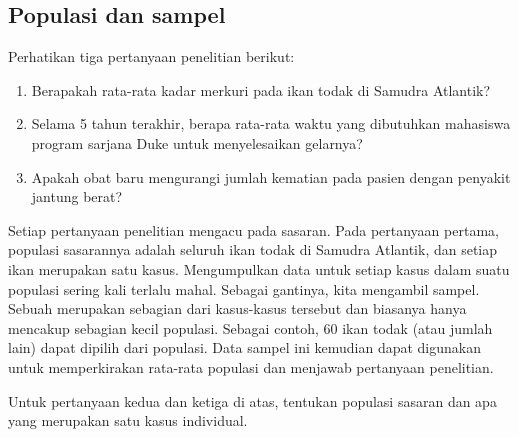 \subsection{Populasi dan sampel}
\label{populationsAndSamples}

\noindent%
Perhatikan tiga pertanyaan penelitian berikut:
\begin{enumerate}
\setlength{\itemsep}{0mm}
\item
    Berapakah rata-rata kadar merkuri pada ikan todak
    di Samudra Atlantik?
\item
    \label{timeToGraduationQuestionForUCLAStudents}%
    Selama 5 tahun terakhir, berapa rata-rata waktu yang dibutuhkan
    mahasiswa program sarjana Duke untuk menyelesaikan gelarnya?
\item
    \label{identifyPopulationOfStentStudy}%
    Apakah obat baru mengurangi jumlah kematian pada pasien
    dengan penyakit jantung berat?
\end{enumerate}
Setiap pertanyaan penelitian mengacu pada  sasaran. Pada
pertanyaan pertama, populasi sasarannya adalah seluruh ikan todak di Samudra
Atlantik, dan setiap ikan merupakan satu kasus. Mengumpulkan data untuk setiap
kasus dalam suatu populasi sering kali terlalu mahal. Sebagai gantinya, kita
mengambil sampel. Sebuah  merupakan sebagian dari kasus-kasus
tersebut dan biasanya hanya mencakup sebagian kecil populasi. Sebagai contoh,
60 ikan todak (atau jumlah lain) dapat dipilih dari populasi. Data sampel ini
kemudian dapat digunakan untuk memperkirakan rata-rata populasi dan menjawab
pertanyaan penelitian.

\begin{exercisewrap}
\begin{nexercise}\label{identifyingThePopulationForTwoQuestionsInPopAndSampSubsection}%
Untuk pertanyaan kedua dan ketiga di atas,
tentukan populasi sasaran dan apa yang
merupakan satu kasus individual.\footnotemark
\end{nexercise}
\end{exercisewrap}


